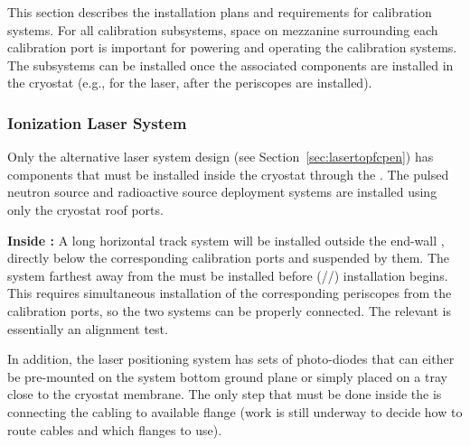 


This section describes the installation plans and requirements for calibration systems. For all calibration subsystems, space on mezzanine surrounding each calibration port is important for powering and operating the calibration systems. The subsystems can be installed once the associated components are installed in the cryostat (e.g., for the laser, after the periscopes are installed).

\subsubsection{Ionization Laser System} 
Only the alternative laser system  design (see Section~\ref{sec:lasertopfcpen})  has components that must be installed inside the cryostat through the . The pulsed neutron source and radioactive source deployment systems are installed using only the cryostat roof ports.


{\bf Inside :} A long horizontal track system will be installed outside the end-wall , directly below the corresponding calibration ports and suspended by them. The system farthest away from the  must be installed before  (//) installation begins. This requires simultaneous installation of the corresponding periscopes from the calibration ports, so the two systems can be properly connected. The relevant  is essentially an alignment test.

In addition, the laser positioning system has sets of photo-diodes that can either be pre-mounted on the  system bottom ground plane or simply placed on a tray close to the cryostat membrane. The only step that must be done inside the  is connecting the cabling to available flange (work is still underway to decide how to route cables and which flanges to use).

